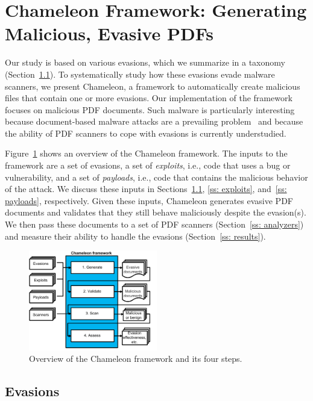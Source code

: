 \section{Chameleon Framework: Generating Malicious, Evasive PDFs}
\label{ss: implementation}

Our study is based on various evasions, which we summarize in a taxonomy (Section~\ref{ss: evasions}).
To systematically study how these evasions evade malware scanners, we present Chameleon, a framework to automatically create malicious files that contain one or more evasions.
Our implementation of the framework focuses on malicious PDF documents.
Such malware is particularly interesting because document-based malware attacks are a prevailing problem~\cite{pdf_cve_statistics, officeonrise, exploit_CVE_2018_4990} and because the ability of PDF scanners to cope with evasions is currently understudied.

Figure~\ref{fig: chameleon overview} shows an overview of the Chameleon framework.
The inputs to the framework are a set of evasions, a set of \emph{exploits}, i.e., code 
that uses a bug or vulnerability, and a set of \emph{payloads}, i.e., code that contains the malicious behavior of the attack.
We discuss these inputs in Sections~\ref{ss: evasions}, \ref{ss: exploits}, and~\ref{ss: payloads}, respectively.
Given these inputs, Chameleon generates evasive PDF documents and validates that they still behave maliciously despite the evasion(s).
We then pass these documents to a set of PDF scanners (Section~\ref{ss: analyzers}) and measure their ability to handle the evasions (Section~\ref{ss: results}).

\begin{figure}
    \centering
    \includegraphics[width=0.5\textwidth]{figures/overview.pdf}
    \caption{Overview of the Chameleon framework and its four steps.}
    \label{fig: chameleon overview}
\end{figure}


\subsection{Evasions}
\label{ss: evasions}

